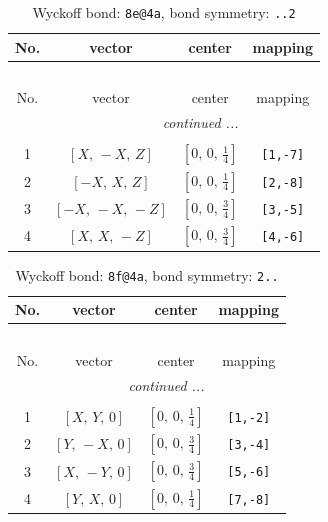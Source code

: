 \documentclass[fleqn,8pt]{jsarticle}
\begin{document}
\renewcommand{\arraystretch}{1.2}
\begin{longtable}{cccc}
\caption{Wyckoff bond: {\tt 8e@4a}, bond symmetry: {\tt ..2}}
 \\
 \hline \hline
No. & vector & center & mapping \\ \hline \endfirsthead

\multicolumn{3}{l}{\tablename\ \thetable{}} \\
 \hline \hline
No. & vector & center & mapping \\ \hline \endhead

 \hline \hline
\multicolumn{3}{r}{\footnotesize\it continued ...} \\ \endfoot

 \hline \hline
\multicolumn{3}{r}{} \\ \endlastfoot

1 & $\left[ X,\, - X,\, Z \right]$ & $\left[ 0,\, 0,\, \frac{1}{4} \right]$ & {\tt [1,-7]} \\ \hline
2 & $\left[ - X,\, X,\, Z \right]$ & $\left[ 0,\, 0,\, \frac{1}{4} \right]$ & {\tt [2,-8]} \\ \hline
3 & $\left[ - X,\, - X,\, - Z \right]$ & $\left[ 0,\, 0,\, \frac{3}{4} \right]$ & {\tt [3,-5]} \\ \hline
4 & $\left[ X,\, X,\, - Z \right]$ & $\left[ 0,\, 0,\, \frac{3}{4} \right]$ & {\tt [4,-6]} \\
\end{longtable}
\renewcommand{\arraystretch}{1.2}
\begin{longtable}{cccc}
\caption{Wyckoff bond: {\tt 8f@4a}, bond symmetry: {\tt 2..}}
 \\
 \hline \hline
No. & vector & center & mapping \\ \hline \endfirsthead

\multicolumn{3}{l}{\tablename\ \thetable{}} \\
 \hline \hline
No. & vector & center & mapping \\ \hline \endhead

 \hline \hline
\multicolumn{3}{r}{\footnotesize\it continued ...} \\ \endfoot

 \hline \hline
\multicolumn{3}{r}{} \\ \endlastfoot

1 & $\left[ X,\, Y,\, 0 \right]$ & $\left[ 0,\, 0,\, \frac{1}{4} \right]$ & {\tt [1,-2]} \\ \hline
2 & $\left[ Y,\, - X,\, 0 \right]$ & $\left[ 0,\, 0,\, \frac{3}{4} \right]$ & {\tt [3,-4]} \\ \hline
3 & $\left[ X,\, - Y,\, 0 \right]$ & $\left[ 0,\, 0,\, \frac{3}{4} \right]$ & {\tt [5,-6]} \\ \hline
4 & $\left[ Y,\, X,\, 0 \right]$ & $\left[ 0,\, 0,\, \frac{1}{4} \right]$ & {\tt [7,-8]} \\
\end{longtable}
\end{document}
